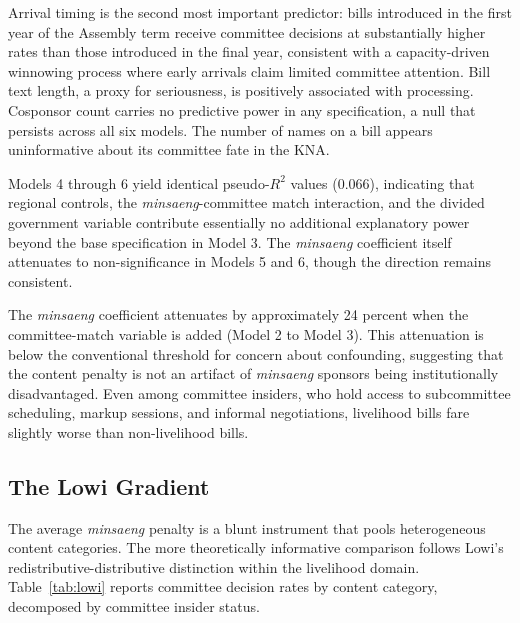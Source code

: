 \documentclass[11pt]{article}
\begin{document}
Arrival timing is the second most important predictor: bills introduced in the first year of the Assembly term receive committee decisions at substantially higher rates than those introduced in the final year, consistent with a capacity-driven winnowing process where early arrivals claim limited committee attention. Bill text length, a proxy for seriousness, is positively associated with processing. Cosponsor count carries no predictive power in any specification, a null that persists across all six models. The number of names on a bill appears uninformative about its committee fate in the KNA.

Models 4 through 6 yield identical pseudo-$R^2$ values (0.066), indicating that regional controls, the \emph{minsaeng}-committee match interaction, and the divided government variable contribute essentially no additional explanatory power beyond the base specification in Model 3. The \emph{minsaeng} coefficient itself attenuates to non-significance in Models 5 and 6, though the direction remains consistent.

The \emph{minsaeng} coefficient attenuates by approximately 24 percent when the committee-match variable is added (Model 2 to Model 3). This attenuation is below the conventional threshold for concern about confounding, suggesting that the content penalty is not an artifact of \emph{minsaeng} sponsors being institutionally disadvantaged. Even among committee insiders, who hold access to subcommittee scheduling, markup sessions, and informal negotiations, livelihood bills fare slightly worse than non-livelihood bills.

\subsection{The Lowi Gradient}\label{sec:lowigradient}

The average \emph{minsaeng} penalty is a blunt instrument that pools heterogeneous content categories. The more theoretically informative comparison follows Lowi's redistributive-distributive distinction within the livelihood domain. Table~\ref{tab:lowi} reports committee decision rates by content category, decomposed by committee insider status.
\end{document}
